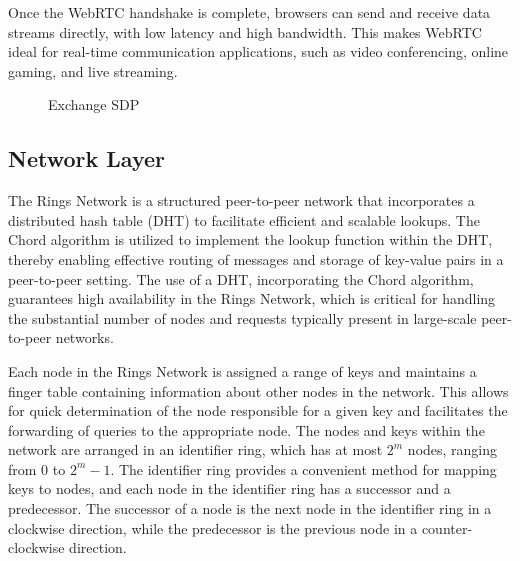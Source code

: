 \documentclass[twocolumn]{article}
\begin{document}
Once the WebRTC handshake is complete, browsers can send and receive data streams directly, with low latency and high bandwidth. This makes WebRTC ideal for real-time communication applications, such as video conferencing, online gaming, and live streaming.


\begin{figure}[htbp]

\caption{Exchange SDP}
\end{figure}

\subsection{Network Layer}

The Rings Network is a structured peer-to-peer network that incorporates a distributed hash table (DHT) to facilitate efficient and scalable lookups. The Chord algorithm is utilized to implement the lookup function within the DHT, thereby enabling effective routing of messages and storage of key-value pairs in a peer-to-peer setting. The use of a DHT, incorporating the Chord algorithm, guarantees high availability in the Rings Network, which is critical for handling the substantial number of nodes and requests typically present in large-scale peer-to-peer networks.

Each node in the Rings Network is assigned a range of keys and maintains a finger table containing information about other nodes in the network. This allows for quick determination of the node responsible for a given key and facilitates the forwarding of queries to the appropriate node. The nodes and keys within the network are arranged in an identifier ring, which has at most $2^m$ nodes, ranging from 0 to $2^m-1$. The identifier ring provides a convenient method for mapping keys to nodes, and each node in the identifier ring has a successor and a predecessor. The successor of a node is the next node in the identifier ring in a clockwise direction, while the predecessor is the previous node in a counter-clockwise direction.
\end{document}
